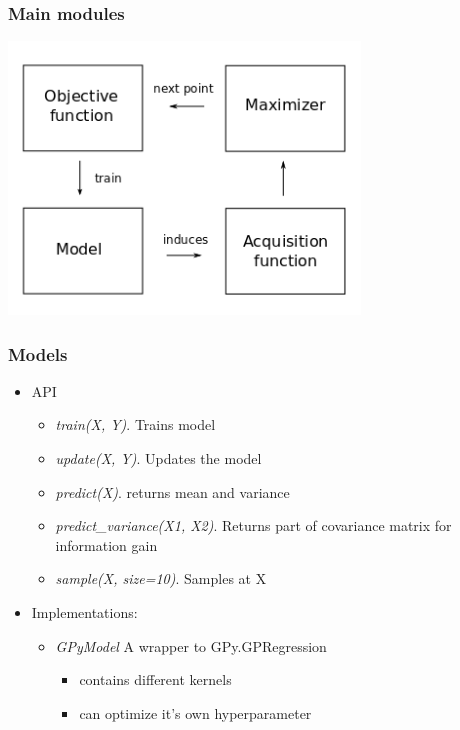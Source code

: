 \documentclass[10pt,handout]{beamer}
\begin{document}
\begin{frame}
\frametitle{Main modules}

\begin{center}
\includegraphics[width=0.7\textwidth]{robo_framework.png}
\end{center}


\end{frame}

\begin{frame}
\frametitle{Models}
\begin{itemize}
\item API
\begin{itemize}
\item \textit{train(X, Y)}. Trains model
\item \textit{update(X, Y)}. Updates the model
\item \textit{predict(X)}. returns mean and variance
\item \textit{predict\_variance(X1, X2)}. Returns part of covariance matrix for information gain
\item \textit{sample(X, size=10)}. Samples at X
\end{itemize}
\item Implementations:
\begin{itemize}
\item \textit{GPyModel} A wrapper to GPy.GPRegression
\begin{itemize}
 \item contains different kernels
 \item can optimize it's own hyperparameter
\end{itemize}
\end{itemize} 
\end{itemize}
\end{frame}
\end{document}
